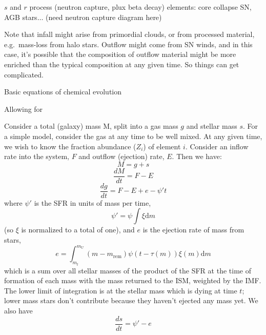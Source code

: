 \documentclass[12pt]{article}
\begin{document}
\begin{itemize*}
\begin{itemize*}
\begin{itemize*}
                \item $s$ and $r$ process (neutron capture, plux beta
                        decay) elements: core collapse SN, AGB stars$\ldots$
                        (need neutron capture diagram here)
            \end{itemize*} %
            \item Note that infall might arise from primordial clouds, or from
                processed material, e.g.\ mass-loss from halo stars. Outflow
                might come from SN winds, and in this case, it's possible that
                the composition of outflow material might be more enriched than
                the typical composition at any given time. So things can get
                complicated.
        \end{itemize*} %
    \item Basic equations of chemical evolution
        \begin{itemize*}
            \item Allowing for
            \item Consider a total (galaxy) mass M, split into a gas mass
                $g$ and stellar mass $s$. For a simple model, consider the
                gas at any time to be well mixed. At any given time, we wish
                to know the fraction abundance ($Z_i$) of element $i$.
                Consider an inflow rate into the system, $F$ and outflow
                (ejection) rate, $E$. Then we have:
                $$ M = g + s $$
                $$ \frac{dM}{dt} = F - E $$
                $$ \frac{dg}{dt} = F - E + e - \psi't $$
                where $\psi'$ is the SFR in units of mass per time,
                $$ \psi' = \psi\int\xi\textrm{d}m $$
                (so $\xi$ is normalized to a total of one), and $e$ is the
                ejection rate of mass from stars,
                $$ e = \int_{m_t}^{m_U} \left(m-m_{\textrm{rem}}\right)
                \psi\left(t-\tau(m)\right)
                \xi\left(m\right)\textrm{d}m $$
                which is a sum over all stellar masses of the product of the
                SFR at the time of formation of each mass with the mass returned
                to the ISM, weighted by the IMF\@. The lower limit of integration
                is at the stellar mass which is dying at time $t$; lower mass
                stars don't contribute because they haven't ejected any mass yet.
                We also have
                $$ \frac{ds}{dt} = \psi' - e$$

\end{itemize*}
\end{itemize*}
\end{document}
